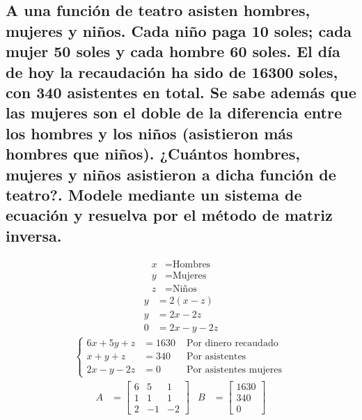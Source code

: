\documentclass[11pt, a4paper]{article}
\begin{document}
\subsection{A una función de teatro asisten hombres, mujeres y niños. Cada niño paga 10 soles; cada mujer 50 soles y cada hombre 60 soles. El día de hoy la recaudación ha sido de 16300 soles, con 340 asistentes en total. Se sabe además que las mujeres son el doble de la diferencia entre los hombres y los niños (asistieron más hombres que niños). ¿Cuántos hombres, mujeres y niños asistieron a dicha función de teatro?. Modele mediante un sistema de ecuación y resuelva por el método de matriz inversa.}
\begin{multicols}{2}
  \begin{align*}
    x &= \text{Hombres}\\
    y &= \text{Mujeres}\\
    z &= \text{Niños}
  \end{align*}
  \begin{align*}
    y &= 2\left(x-z\right)\\
    y &= 2x-2z\\
    0 &= 2x-y-2z 
  \end{align*}
  \begin{align*}
    \left\{
    \begin{array}{rcl}
      6x+5y+z &= 1630& \text{ Por dinero recaudado}\\
      x+y+z &= 340& \text{ Por asistentes}\\
      2x-y-2z &= 0& \text{ Por asistentes mujeres}
    \end{array}
    \right.\
  \end{align*}
  \begin{align*}
    A &= \begin{bmatrix}
      6 & 5 & 1\\
      1 & 1 & 1\\
      2 & -1 & -2
    \end{bmatrix}&
    B &= \begin{bmatrix}
      1630\\
      340\\
      0
    \end{bmatrix}
  \end{align*}
  \begin{align*}

\end{align*}
\end{multicols}
\end{document}
